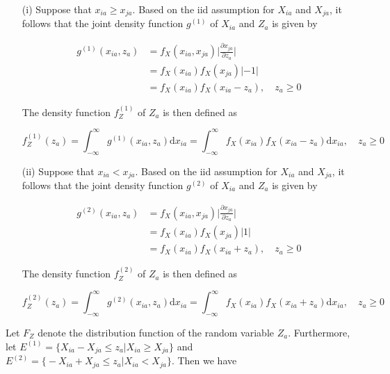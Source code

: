 \documentclass[10pt,letterpaper]{article}\usepackage[]{graphicx}\usepackage[]{color}
\begin{document}
\begin{itemize}
\item[(i)] Suppose that $x_{ia} \geq x_{ja}$. Based on the iid assumption for $X_{ia}$ and $X_{ja}$, it follows that the joint density function $g^{(1)}$ of $X_{ia}$ and $Z_a$ is given by

\begin{equation}
\begin{aligned}
g^{(1)}(x_{ia},z_a) &= f_X(x_{ia},x_{ja})\biggl|\frac{\partial x_{ja}}{\partial z_a}\biggr| \\
&= f_X(x_{ia})f_X(x_{ja})|-1| \\
&= f_X(x_{ia})f_X(x_{ia}-z_a), \quad z_a \geq 0
\end{aligned}
\end{equation}

The density function $f^{(1)}_Z$ of $Z_a$ is then defined as

\begin{equation}
f^{(1)}_Z(z_a) = \int_{-\infty}^{\infty} g^{(1)}(x_{ia},z_a)\text{d}x_{ia} = \int_{-\infty}^{\infty} f_X(x_{ia})f_X(x_{ia}-z_a)\text{d}x_{ia}, \quad z_a \geq 0
\end{equation}

\item[(ii)] Suppose that $x_{ia} < x_{ja}$. Based on the iid assumption for $X_{ia}$ and $X_{ja}$, it follows that the joint density function $g^{(2)}$ of $X_{ia}$ and $Z_a$ is given by

\begin{equation}
\begin{aligned}
g^{(2)}(x_{ia},z_a) &= f_X(x_{ia},x_{ja})\biggl|\frac{\partial x_{ja}}{\partial z_a}\biggr| \\
&= f_X(x_{ia})f_X(x_{ja})|1| \\
&= f_X(x_{ia})f_X(x_{ia}+z_a), \quad z_a \geq 0
\end{aligned}
\end{equation}

The density function $f^{(2)}_Z$ of $Z_a$ is then defined as

\begin{equation}
f^{(2)}_Z(z_a) = \int_{-\infty}^{\infty} g^{(2)}(x_{ia},z_a)\text{d}x_{ia} = \int_{-\infty}^{\infty} f_X(x_{ia})f_X(x_{ia}+z_a)\text{d}x_{ia}, \quad z_a \geq 0
\end{equation}
\end{itemize}

Let $F_Z$ denote the distribution function of the random variable $Z_a$. Furthermore, let $E^{(1)}=\bigl\{X_{ia}-X_{ja} \leq z_a | X_{ia} \geq X_{ja}\bigr\}$ and $E^{(2)}=\bigl\{-X_{ia}+X_{ja} \leq z_a | X_{ia} < X_{ja}\bigr\}$. Then we have
\end{document}
